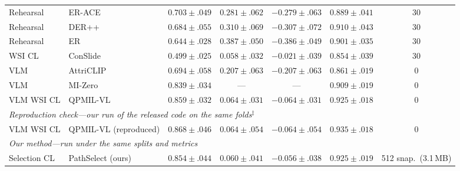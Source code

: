 \documentclass{article}
\begin{document}
\begin{table}[!t]
\begin{tabular}{llccccc}
Rehearsal & ER-ACE \cite{caccia2022erace} & $0.703{\pm}.049$ & $0.281{\pm}.062$ & $-0.279{\pm}.063$ & $0.889{\pm}.041$ & 30 \\
Rehearsal & DER++ \cite{buzzega2020derpp} & $0.684{\pm}.055$ & $0.310{\pm}.069$ & $-0.307{\pm}.072$ & $0.910{\pm}.043$ & 30 \\
Rehearsal & ER \cite{chaudhry2019er} & $0.644{\pm}.028$ & $0.387{\pm}.050$ & $-0.386{\pm}.049$ & $0.901{\pm}.035$ & 30 \\
WSI CL & ConSlide \cite{huang2023conslide} & $0.499{\pm}.025$ & $0.058{\pm}.032$ & $-0.021{\pm}.039$ & $0.854{\pm}.039$ & 30 \\
VLM & AttriCLIP \cite{wang2023attriclip} & $0.694{\pm}.058$ & $0.207{\pm}.063$ & $-0.207{\pm}.063$ & $0.861{\pm}.019$ & 0 \\
VLM & MI-Zero \cite{lu2023mizero} & $0.839{\pm}.034$ & --- & --- & $0.909{\pm}.019$ & 0 \\
VLM WSI CL & QPMIL-VL \cite{gou2025qpmil} & $0.859{\pm}.032$ & $0.064{\pm}.031$ & $-0.064{\pm}.031$ & $0.925{\pm}.018$ & 0 \\
\midrule
\multicolumn{7}{l}{\emph{Reproduction check---our run of the released code on the same folds$^\ddagger$}} \\
VLM WSI CL & QPMIL-VL (reproduced) & $0.868{\pm}.046$ & $0.064{\pm}.054$ & $-0.064{\pm}.054$ & $0.935{\pm}.018$ & 0 \\
\midrule
\multicolumn{7}{l}{\emph{Our method---run under the same splits and metrics}} \\
Selection CL & PathSelect (ours) & $0.854{\pm}.044$ & $0.060{\pm}.041$ & $-0.056{\pm}.038$ & $0.925{\pm}.019$ & 512 snap.\ (3.1\,MB) \\
\bottomrule
\end{tabular}
\end{table}
\end{document}
